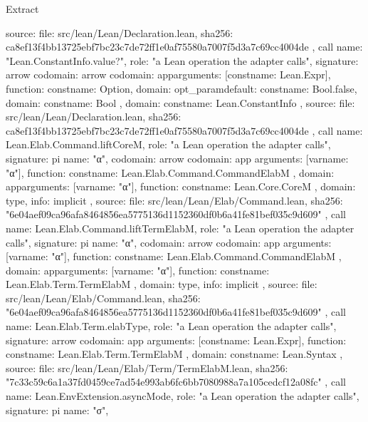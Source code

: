 \begin{lexlean}{Extract}
\begin{toolingmodule}
{{      source: {
        file: src/lean/Lean/Declaration.lean,
        sha256: ca8ef13f4bb13725ebf7bc23c7de72ff1e0af75580a7007f5d3a7c69cc4004de
      }
    },
    call{
      name: "Lean.ConstantInfo.value?",
      role: "a Lean operation the adapter calls",
      signature: arrow{
        codomain: arrow{
          codomain: app{arguments: [const{name: Lean.Expr}], function: const{name: Option}},
          domain: opt_param{default: const{name: Bool.false}, domain: const{name: Bool}}
        },
        domain: const{name: Lean.ConstantInfo}
      },
      source: {
        file: src/lean/Lean/Declaration.lean,
        sha256: ca8ef13f4bb13725ebf7bc23c7de72ff1e0af75580a7007f5d3a7c69cc4004de
      }
    },
    call{
      name: Lean.Elab.Command.liftCoreM,
      role: "a Lean operation the adapter calls",
      signature: pi{
        name: "α",
        codomain: arrow{
          codomain: app{
            arguments: [var{name: "α"}],
            function: const{name: Lean.Elab.Command.CommandElabM}
          },
          domain: app{arguments: [var{name: "α"}], function: const{name: Lean.Core.CoreM}}
        },
        domain: type{},
        info: implicit
      },
      source: {
        file: src/lean/Lean/Elab/Command.lean,
        sha256: "6e04aef09ca96afa8464856ea5775136d1152360df0b6a41fe81bef035c9d609"
      }
    },
    call{
      name: Lean.Elab.Command.liftTermElabM,
      role: "a Lean operation the adapter calls",
      signature: pi{
        name: "α",
        codomain: arrow{
          codomain: app{
            arguments: [var{name: "α"}],
            function: const{name: Lean.Elab.Command.CommandElabM}
          },
          domain: app{arguments: [var{name: "α"}], function: const{name: Lean.Elab.Term.TermElabM}}
        },
        domain: type{},
        info: implicit
      },
      source: {
        file: src/lean/Lean/Elab/Command.lean,
        sha256: "6e04aef09ca96afa8464856ea5775136d1152360df0b6a41fe81bef035c9d609"
      }
    },
    call{
      name: Lean.Elab.Term.elabType,
      role: "a Lean operation the adapter calls",
      signature: arrow{
        codomain: app{
          arguments: [const{name: Lean.Expr}],
          function: const{name: Lean.Elab.Term.TermElabM}
        },
        domain: const{name: Lean.Syntax}
      },
      source: {
        file: src/lean/Lean/Elab/Term/TermElabM.lean,
        sha256: "7c33c59c6a1a37fd0459ce7ad54e993ab6fc6bb7080988a7a105cedcf12a08fc"
      }
    },
    call{
      name: Lean.EnvExtension.asyncMode,
      role: "a Lean operation the adapter calls",
      signature: pi{
        name: "σ",
}}}
\end{toolingmodule}
\end{lexlean}
